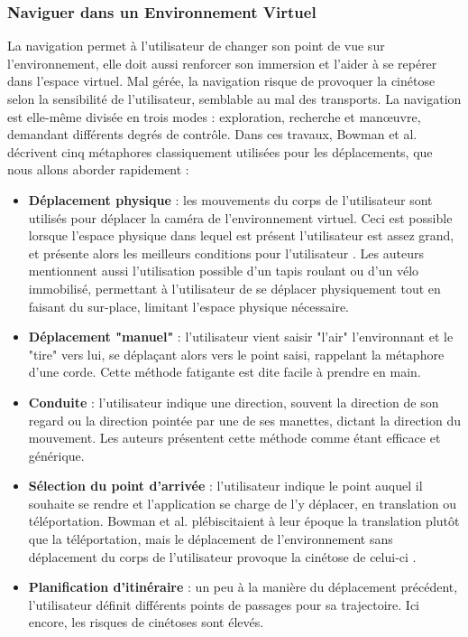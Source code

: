 	\subsubsection{Naviguer dans un Environnement Virtuel}
		La navigation permet à l'utilisateur de changer son point de vue sur l'environnement, elle doit aussi renforcer son immersion et l'aider à se repérer dans l'espace virtuel. Mal gérée, la navigation risque de provoquer la cinétose selon la sensibilité de l'utilisateur, semblable au mal des transports. La navigation est elle-même divisée en trois modes : exploration, recherche et manœuvre, demandant différents degrés de contrôle. Dans ces travaux, Bowman et al. décrivent cinq métaphores classiquement utilisées pour les déplacements, que nous allons aborder rapidement :
		\begin{itemize}
		\item \textbf{Déplacement physique} : les mouvements du corps de l'utilisateur sont utilisés pour déplacer la caméra de l'environnement virtuel. Ceci est possible lorsque l'espace physique dans lequel est présent l'utilisateur est assez grand, et présente alors les meilleurs conditions pour l'utilisateur \cite{cherep_spatial_2020}. Les auteurs mentionnent aussi l'utilisation possible d'un tapis roulant ou d'un vélo immobilisé, permettant à l'utilisateur de se déplacer physiquement tout en faisant du sur-place, limitant l'espace physique nécessaire.
		\item \textbf{Déplacement "manuel"} : l'utilisateur vient saisir "l'air" l'environnant et le "tire" vers lui, se déplaçant alors vers le point saisi, rappelant la métaphore d'une corde. Cette méthode fatigante est dite facile à prendre en main.
		\item \textbf{Conduite} : l'utilisateur indique une direction, souvent la direction de son regard ou la direction pointée par une de ses manettes, dictant la direction du mouvement. Les auteurs présentent cette méthode comme étant efficace et générique. 
		\item \textbf{Sélection du point d'arrivée} : l'utilisateur indique le point auquel il souhaite se rendre et l'application se charge de l'y déplacer, en translation ou téléportation. Bowman et al. plébiscitaient à leur époque la translation plutôt que la téléportation, mais le déplacement de l'environnement sans déplacement du corps de l'utilisateur provoque la cinétose de celui-ci \cite{cherep_spatial_2020}.
		\item \textbf{Planification d'itinéraire} : un peu à la manière du déplacement précédent, l'utilisateur définit différents points de passages pour sa trajectoire. Ici encore, les risques de cinétoses sont élevés.
		\end{itemize}
		
